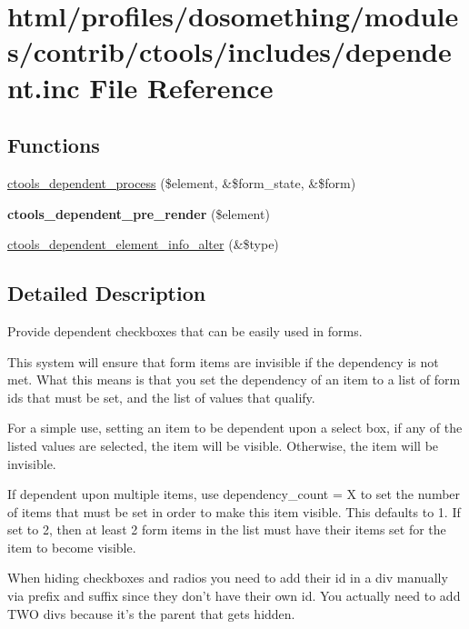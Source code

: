 \hypertarget{dependent_8inc}{
\section{html/profiles/dosomething/modules/contrib/ctools/includes/dependent.inc File Reference}
\label{dependent_8inc}
}
\subsection*{Functions}
\begin{DoxyCompactItemize}
\item 
\hyperlink{dependent_8inc_aa4105a7a7db8a659ab7d7a76a4c541e0}{ctools\_\-dependent\_\-process} (\$element, \&\$form\_\-state, \&\$form)
\item 
\hypertarget{dependent_8inc_a3efb9147fdb16e36de9219f3cae4f60c}{
{\bfseries ctools\_\-dependent\_\-pre\_\-render} (\$element)}
\label{dependent_8inc_a3efb9147fdb16e36de9219f3cae4f60c}

\item 
\hyperlink{dependent_8inc_a47834c9e31868db6efb1d5d04e34dbfc}{ctools\_\-dependent\_\-element\_\-info\_\-alter} (\&\$type)
\end{DoxyCompactItemize}


\subsection{Detailed Description}
Provide dependent checkboxes that can be easily used in forms.

This system will ensure that form items are invisible if the dependency is not met. What this means is that you set the dependency of an item to a list of form ids that must be set, and the list of values that qualify.

For a simple use, setting an item to be dependent upon a select box, if any of the listed values are selected, the item will be visible. Otherwise, the item will be invisible.

If dependent upon multiple items, use dependency\_\-count = X to set the number of items that must be set in order to make this item visible. This defaults to 1. If set to 2, then at least 2 form items in the list must have their items set for the item to become visible.

When hiding checkboxes and radios you need to add their id in a div manually via prefix and suffix since they don't have their own id. You actually need to add TWO divs because it's the parent that gets hidden.

